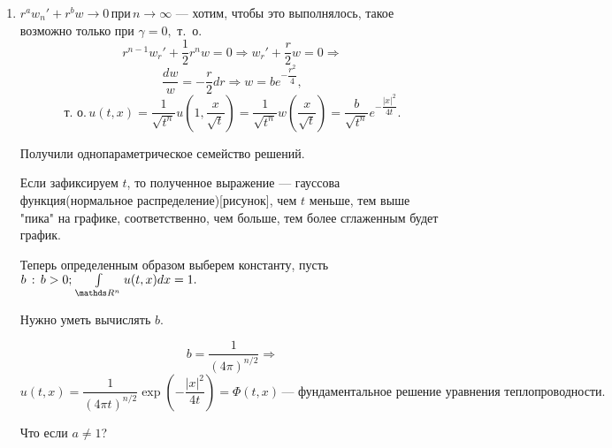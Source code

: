 \begin{enumerate}
\item $r^aw_n' + r^bw \rightarrow 0 \, \text{при} \, n \rightarrow \infty$ --- хотим, чтобы это выполнялось, такое возможно только при $\gamma = 0,$ т.~о.
$$r^{n-1}w_r' + \dfrac{1}{2}r^nw = 0 \Rightarrow w_r' + \dfrac{r}{2}w = 0 \Rightarrow$$
$$\dfrac{dw}{w} = -\dfrac{r}{2}dr \Rightarrow w = be^{-\dfrac{r^2}{4}},$$
$$\text{т.~о.} \, u(t,x) = \dfrac{1}{\sqrt{t^n}}u\left(1, \dfrac{x}{\sqrt{t}}\right) = \dfrac{1}{\sqrt{t^n}}w\left(\dfrac{x}{\sqrt{t}}\right) = \dfrac{b}{\sqrt{t^n}}e^{-\dfrac{|x|^2}{4t}}.$$

Получили однопараметрическое семейство решений.
\begin{note}Если зафиксируем $t$, то полученное выражение --- гауссова функция(нормальное распределение)[рисунок], чем $t$ меньше, тем выше "пика" на графике, соответственно, чем больше, тем более сглаженным будет график.
\end{note}
Теперь определенным образом выберем константу, пусть $b\,:\,b>0; \, \int\limits_{\real^n} u(t,x)dx = 1.$

\begin{note}
Нужно уметь вычислять $b$.
\end{note}

$$b = \dfrac{1}{(4\pi)^{n/2}} \Rightarrow$$$$ u(t,x) = \dfrac{1}{(4\pi t)^{n/2}} \exp\left(-\dfrac{|x|^2}{4t}\right) = \Phi(t,x) \,\text{--- фундаментальное решение уравнения теплопроводности.}$$
\begin{note}
Что если $a \not= 1$?
\end{note}
\end{enumerate}


